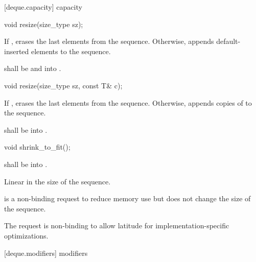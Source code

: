[deque.capacity]{ capacity}

%
\begin{itemdecl}
void resize(size_type sz);
\end{itemdecl}

\begin{itemdescr}
\pnum
\effects If , erases the last  elements
from the sequence. Otherwise,
appends  default-inserted elements to the sequence.

\pnum
\requires {} shall be  and  into .
\end{itemdescr}

%
\begin{itemdecl}
void resize(size_type sz, const T& c);
\end{itemdecl}

\begin{itemdescr}
\pnum
\effects If , erases the last  elements
from the sequence. Otherwise,
appends  copies of  to the sequence.

\pnum
\requires {} shall be
 into .
\end{itemdescr}

%
%
\begin{itemdecl}
void shrink_to_fit();
\end{itemdecl}

\begin{itemdescr}
\pnum
\requires {} shall be  into .

\pnum
\complexity Linear in the size of the sequence.

\pnum
\remarks {} is a non-binding request to reduce memory use
but does not change the size of the sequence. \begin{note} The request is non-binding to allow latitude for implementation-specific optimizations. \end{note}
\end{itemdescr}

[deque.modifiers]{ modifiers}

